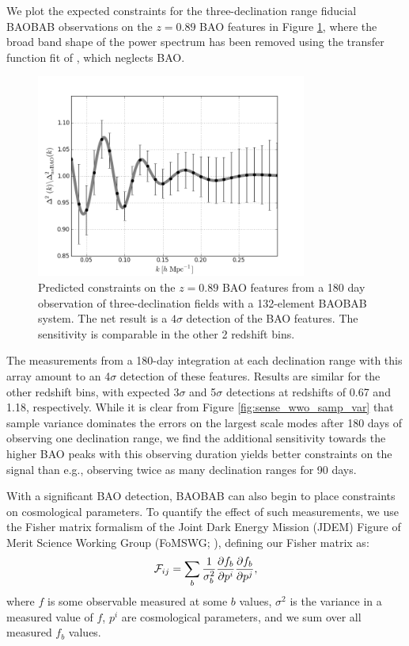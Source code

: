 \documentclass[10pt,iop]{emulateapj}
\begin{document}
We plot the expected constraints for the three-declination range fiducial BAOBAB observations on
the $z = 0.89$ BAO features in Figure \ref{fig:baobab128_sense}, where the broad band
shape of the power spectrum has been removed using the transfer function fit
of \citet{eisenstein_and_hu_1998}, which neglects BAO.  
\begin{figure}\centering
\includegraphics[width=3.5in]{baobab128_sense-2.png}
\caption{Predicted constraints on the $z = 0.89$ BAO features from a 180 day observation
of three-declination fields with
a 132-element BAOBAB system.  The net result is a $4\sigma$ detection of the BAO features.  The sensitivity is comparable in the other 2 redshift bins.
} \label{fig:baobab128_sense}
\end{figure}
The measurements from a 180-day integration at each declination range with this array 
amount to an 4$\sigma$ detection of these features.  Results are similar
for the other redshift bins, with expected 3$\sigma$ and 5$\sigma$ detections at redshifts of 
0.67 and 1.18, respectively.  While it is clear from Figure \ref{fig:sense_wwo_samp_var} that
sample variance dominates the errors on the largest scale modes after 180 days of observing
one declination range, we find the additional sensitivity towards the higher BAO peaks with this
observing duration yields better constraints on the signal than e.g., observing twice as many
declination ranges for 90 days.  

With a significant BAO detection, BAOBAB can also begin to place 
constraints on cosmological parameters.  To quantify the effect of such measurements,
we use the Fisher matrix formalism of the Joint Dark Energy Mission (JDEM) Figure of Merit
Science Working Group (FoMSWG; \citealt{albrecht_et_al_2009}), defining our Fisher matrix as:
\begin{equation}
\label{eq:fish}
{\cal F}_{ij} = \sum_b \frac{1}{\sigma_b^2}\frac{\partial f_b}{\partial p^i}\frac{\partial f_b}{\partial p^j},
\end{equation}
where $f$ is some observable measured at some $b$ values, $\sigma^2$ is the variance in a 
measured value of $f$, $p^i$ are cosmological parameters, and
we sum over all measured $f_b$ values.  
\end{document}
